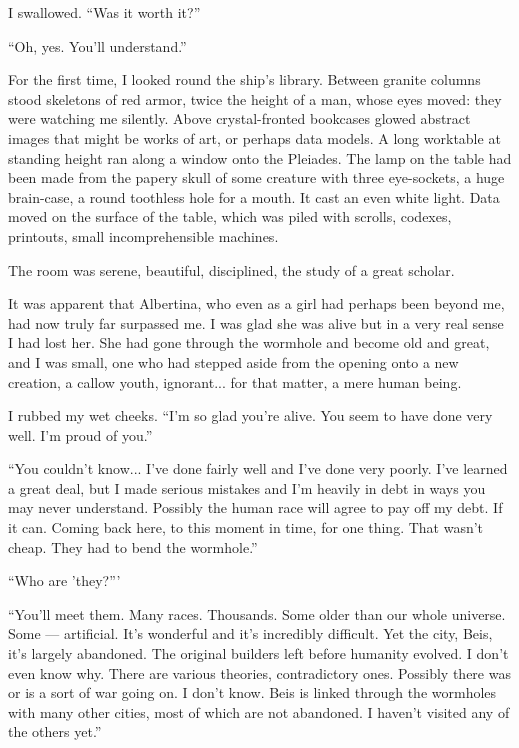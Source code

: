\documentclass[english,11pt,letterpaper,onecolumn]{scrbook}
\begin{document}
	I swallowed.  ``Was it worth it?''

	``Oh, yes.  You'll understand.''

	For the first time, I looked round the ship's library.  Between granite columns stood skeletons of red armor, twice the height of a man, whose eyes moved:  they were watching me silently.  Above crystal-fronted bookcases glowed abstract images that might be works of art, or perhaps data models.  A long worktable at standing height ran along a window onto the Pleiades.  The lamp on the table had been made from the papery skull of some creature with three eye-sockets, a huge brain-case, a round toothless hole for a mouth.  It cast an even white light.  Data moved on the surface of the table, which was piled with scrolls, codexes, printouts, small incomprehensible machines.  

	The room was serene, beautiful, disciplined, the study of a great scholar.  

	It was apparent that Albertina, who even as a girl had perhaps been beyond me, had now truly far surpassed me.  I was glad she was alive but in a very real sense I had lost her.  She had gone through the wormhole and become old and great, and I was small, one who had stepped aside from the opening onto a new creation, a callow youth, ignorant... for that matter, a mere human being.

	I rubbed my wet cheeks.  ``I'm so glad you're alive.  You seem to have done very well.  I'm proud of you.''

	``You couldn't know... I've done fairly well and I've done very poorly.  I've learned a great deal, but I made serious mistakes and I'm heavily in debt in ways you may never understand.  Possibly the human race will agree to pay off my debt.  If it can.  Coming back here, to this moment in time, for one thing.  That wasn't cheap.  They had to bend the wormhole.''

	``Who are 'they?'''

	``You'll meet them.  Many races.  Thousands.  Some older than our whole universe.  Some --- artificial.  It's wonderful and it's incredibly difficult.  Yet the city, Beis, it's largely abandoned.  The original builders left before humanity evolved.  I don't even know why.  There are various theories, contradictory ones.  Possibly there was or is a sort of war going on.  I don't know.  Beis is linked through the wormholes with many other cities, most of which are not abandoned.  I haven't visited any of the others yet.''
\end{document}
